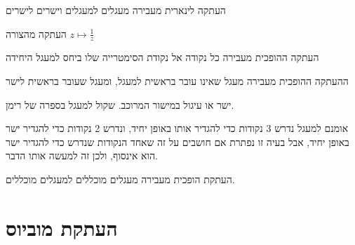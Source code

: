 \documentclass{tstextbook}
\begin{document}
\begin{proposition}
העתקה לינארית מעבירה מעגלים למעגלים וישרים לישרים

\end{proposition}
\begin{definition}
העתקה מהצורה \(z\mapsto \frac{1}{z}\)

\end{definition}
\begin{proposition}
העתקה ההופכית מעבירה כל נקודה אל נקודת הסימטרייה שלו ביחס למעגל היחידה

\end{proposition}
\begin{proposition}
ההעתקה ההופכית מעבירה מעגל שאינו עובר בראשית למעגל, ומעגל שעובר בראשית לישר

\end{proposition}
\begin{definition}
ישר או עיגול במישור המרוכב. שקול למעגל בספרה של רימן.

\end{definition}
\begin{remark}
אומנם למעגל נדרש 3 נקודות כדי להגדיר אותו באופן יחיד, ונדרש 2 נקודות כדי להגדיר ישר באופן יחיד, אבל בעיה זו נפתרת אם חושבים על זה שאחד הנקודות שנדרש כדי להגדיר ישר הוא אינסוף, ולכן זה למעשה אותו הדבר.

\end{remark}
\begin{corollary}
העתקת הופכית מעבירה מעגלים מוכללים למעגלים מוכללים.

\end{corollary}
\section{העתקת מוביוס}
\end{document}
